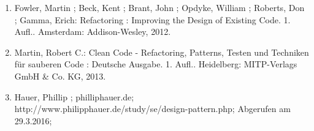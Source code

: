 \documentclass[11pt,a4paper,bibliography=totocnumbered,listof=totocnumbered]{scrartcl}
\begin{document}






\renewcommand\refname{Quellenverzeichnis}


\vspace{10px}
\begin{enumerate}
	
	\item Fowler, Martin ; Beck, Kent ; Brant, John ; Opdyke, William ; Roberts, Don ; Gamma, Erich: Refactoring : Improving the Design of Existing Code. 1. Aufl.. Amsterdam: Addison-Wesley, 2012.
	\item Martin, Robert C.: Clean Code - Refactoring, Patterns, Testen und Techniken für sauberen Code : Deutsche Ausgabe. 1. Aufl.. Heidelberg: MITP-Verlags GmbH \& Co. KG, 2013.
	\item Hauer, Phillip ; philliphauer.de; http://www.philipphauer.de/study/se/design-pattern.php; Abgerufen am 29.3.2016;
\end{enumerate}


\pagebreak

\end{document}
